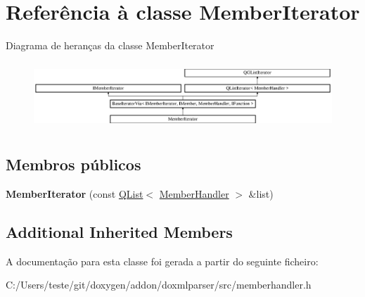 \hypertarget{class_member_iterator}{\section{Referência à classe Member\-Iterator}
\label{class_member_iterator}
}
Diagrama de heranças da classe Member\-Iterator\begin{figure}[H]
\begin{center}
\leavevmode
\includegraphics[height=2.551253cm]{class_member_iterator}
\end{center}
\end{figure}
\subsection*{Membros públicos}
\begin{DoxyCompactItemize}
\item 
\hypertarget{class_member_iterator_a463f5817db8e2e69351dc1672c59454b}{{\bfseries Member\-Iterator} (const \hyperlink{class_q_list}{Q\-List}$<$ \hyperlink{class_member_handler}{Member\-Handler} $>$ \&list)}\label{class_member_iterator_a463f5817db8e2e69351dc1672c59454b}

\end{DoxyCompactItemize}
\subsection*{Additional Inherited Members}


A documentação para esta classe foi gerada a partir do seguinte ficheiro\-:\begin{DoxyCompactItemize}
\item 
C\-:/\-Users/teste/git/doxygen/addon/doxmlparser/src/memberhandler.\-h\end{DoxyCompactItemize}
